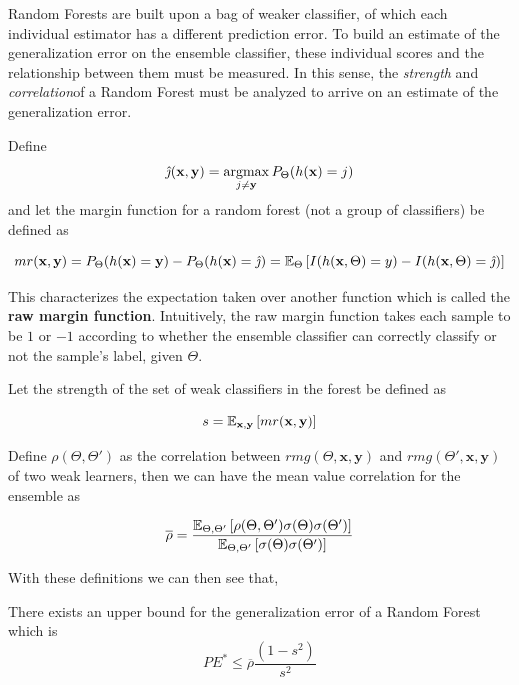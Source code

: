 Random Forests are built upon a bag of weaker classifier, of which each individual estimator has a different prediction error.
To build an estimate of the generalization error on the ensemble classifier, these individual scores and the relationship between them must be measured.
In this sense, the \textit{strength} and \textit{correlation}of a Random Forest must be analyzed to arrive on an estimate of the generalization error.


Define $$\hat{\jmath}( \textbf{x},\textbf{y}) = \operatorname*{argmax}_{j \neq \textbf{y}} P_{\Theta}(h(\textbf{x}) = j)$$ and let the margin function for a random forest (not a group of classifiers) be defined as

\[
mr(\textbf{x},\textbf{y}) = P_{\Theta}(h(\textbf{x}) = \textbf{y}) - P_{\Theta}(h(\textbf{x}) = \hat{\jmath})
\\
= \operatorname{\mathbb{E}}_{\Theta} \left[ I(h(\textbf{x},\Theta ) = y ) - I( h( \textbf{x},\Theta ) = \hat{\jmath} ) \right]
\]

This characterizes the expectation taken over another function which is called the \textbf{raw margin function}.
Intuitively, the raw margin function takes each sample to be $1$ or $-1$ according to whether the ensemble classifier can correctly classify or not the sample's label, given $\Theta$.

Let the strength of the set of weak classifiers in the forest be defined as

\begin{equation}
s = \operatorname{\mathbb{E}}_{\textbf{x},\textbf{y}} \left[ mr(\textbf{x},\textbf{y} ) \right]
\end{equation}

Define $ \rho(\Theta, \Theta')$ as the correlation between $rmg(\Theta,\textbf{x},\textbf{y})$ and $rmg(\Theta',\textbf{x},\textbf{y})$ of two weak learners, then we can have the mean value correlation for the ensemble as 

\begin{equation}
\overline{\rho} = \frac{\operatorname{\mathbb{E}}_{\Theta, \Theta'} \left[ \rho(\Theta, \Theta') \sigma(\Theta) \sigma(\Theta')\right]}
{\operatorname{\mathbb{E}}_{\Theta, \Theta'} \left[ \sigma(\Theta) \sigma(\Theta')\right]}
\end{equation}

With these definitions we can then see that,

\begin{theorem}
There exists an upper bound for the generalization error of a Random Forest which is    \begin{equation}
PE^* \leq \overline{\rho}\frac{(1-s^2)}{s^2}
\end{equation}
\end{theorem}

